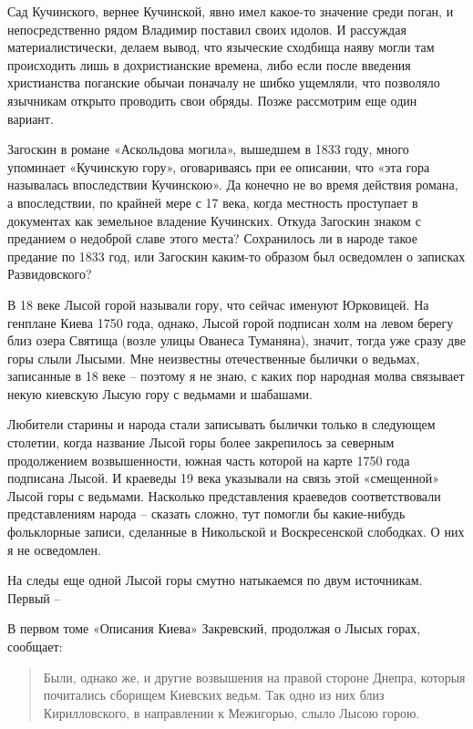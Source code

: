 Сад Кучинского, вернее Кучинской, явно имел какое-то значение среди поган, и непосредственно рядом Владимир поставил своих идолов. И рассуждая материалистически, делаем вывод, что языческие сходбища наяву могли там происходить лишь в дохристианские времена, либо если после введения христианства поганские обычаи поначалу не шибко ущемляли, что позволяло язычникам открыто проводить свои обряды. Позже рассмотрим еще один вариант.

Загоскин в романе «Аскольдова могила», вышедшем в 1833 году, много упоминает  «Кучинскую гору», оговариваясь при ее описании, что «эта гора называлась впоследствии Кучинскою». Да конечно не во время действия романа, а впоследствии, по крайней мере с 17 века, когда местность проступает в документах как земельное владение Кучинских. Откуда Загоскин знаком с преданием о недоброй славе этого места? Сохранилось ли в народе такое предание по 1833 год, или Загоскин каким-то образом был осведомлен о записках Развидовского?

В 18 веке Лысой горой называли гору, что сейчас именуют Юрковицей. На генплане Киева 1750 года, однако, Лысой горой подписан холм на левом берегу близ озера Святища (возле улицы Ованеса Туманяна), значит, тогда уже сразу две горы слыли Лысыми. Мне неизвестны отечественные былички о ведьмах, записанные в 18 веке – поэтому я не знаю, с каких пор народная молва связывает некую киевскую Лысую гору с ведьмами и шабашами.

Любители старины и народа стали записывать былички только в следующем столетии, когда название Лысой горы более закрепилось за северным продолжением возвышенности, южная часть которой на карте 1750 года подписана Лысой. И краеведы 19 века указывали на связь этой «смещенной» Лысой горы с ведьмами. Насколько представления краеведов соответствовали представлениям народа – сказать сложно, тут помогли бы какие-нибудь фольклорные записи, сделанные в Никольской и Воскресенской слободках. О них я не осведомлен.

На следы еще одной Лысой горы смутно натыкаемся по двум источникам. Первый – 

В первом томе «Описания Киева» Закревский, продолжая о Лысых горах, сообщает:

\begin{quotation}
Были, однако же, и другие возвышения на правой стороне Днепра, которыя почитались сборищем Киевских ведьм. Так одно из них близ Кирилловского, в направлении к Межигорью, слыло Лысою горою.
\end{quotation}

